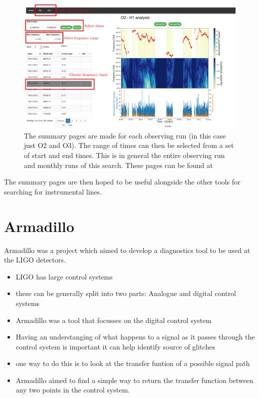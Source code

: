\begin{figure}
	\centering
	\includegraphics[width=\textwidth]{C5_detchar/summary_annot.pdf}
	\caption[Example summary page for SOAP search]{The summary pages are made for each observing run (in this case just O2 and O3). The range of times can then be selected from a set of start and end times. This is in general the entire observing run and monthly runs of this search. These pages can be found at \citep{bayleyHome}}
	\label{detchar:summary:plots}
\end{figure}

The summary pages are then hoped to be useful alongside the other tools for searching for instrumental lines. 

\clearpage

\section{Armadillo}

Armadillo was a project which aimed to develop a diagnostics tool to be used at the \gls{LIGO} detectors.

\begin{itemize}
	\item LIGO has large control systems
	\item these can be generally split into two parts: Analogue and digital control systems
	\item Armadillo was a tool that focusses on the digital control system
	\item Having an understanging of what happens to a signal as it passes through the control system is important it can help identify source of glitches
	\item one way to do this is to look at the transfer funtion of a possible signal path 
	\item Armadillo aimed to find a simple way to return the transfer function between any two points in the control system.
\end{itemize}


